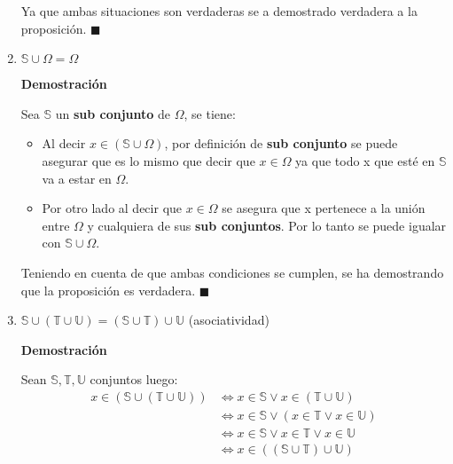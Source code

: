 \documentclass[a4paper,dvipsnames]{book}
\newcommand{\np}{\null\newpage}
\begin{document}
\begin{enumerate}
                Ya que ambas situaciones son verdaderas se a demostrado
                verdadera a la proposición. $\blacksquare$

                \item $\mathbb S\cup \Omega = \Omega$

                \textbf{Demostración}

                Sea $\mathbb S$ un \textbf{sub conjunto} de $\Omega$, se tiene:

                \begin{itemize}
                    \item Al decir $x\in\left( \mathbb S\cup\Omega \right)$,
                        por definición de \textbf{sub conjunto} se puede
                        asegurar que es lo mismo que decir que $x\in\Omega$ ya
                        que todo x que esté en $\mathbb S$ va a estar en
                        $\Omega$.
                    \item Por otro lado al decir que $x\in\Omega$ se asegura
                        que x pertenece a la unión entre $\Omega$ y cualquiera
                        de sus \textbf{sub conjuntos}. Por lo tanto se puede
                        igualar con $\mathbb S\cup\Omega$.
                \end{itemize}

            Teniendo en cuenta de que ambas condiciones se cumplen, se ha
            demostrando que la proposición es verdadera. $\blacksquare$
            \np
                \item $\mathbb S\cup(\mathbb T\cup  \mathbb U) = (\mathbb S\cup
                    \mathbb T)\cup \mathbb U$ (asociatividad)

                \textbf{Demostración}

                Sean $\mathbb S,\mathbb T,\mathbb U$ conjuntos luego:
                \begin{equation*}

                \begin{split}
                    x\in\left( \mathbb S\cup\left( \mathbb T\cup\mathbb U
                    \right) \right) & \iff x\in\mathbb S\lor x\in\left( \mathbb
                    T\cup\mathbb U\right)\\
                    & \iff x\in\mathbb S\lor \left( x\in\mathbb T\lor x
                    \in\mathbb U \right)\\
                    & \iff x\in\mathbb S\lor x\in\mathbb T\lor x \in\mathbb U\\
                    & \iff x\in\left( \left( \mathbb S\cup \mathbb T
                    \right)\cup\mathbb U \right)\\
                \end{split}
                \end{equation*}


\end{enumerate}
\end{document}
